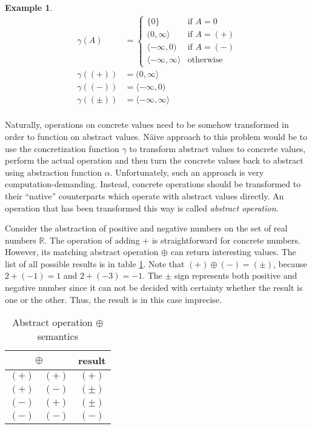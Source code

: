 \documentclass[12pt,final,oneside]{fithesis2}
\theoremstyle{definition}
\newtheorem{example}{Example}[chapter]
\begin{document}
\begin{example}
\label{ex:concretizationfunc}
\begin{align*}
\gamma(A) &=
\begin{cases}
\{ 0 \} & \text{if } A = 0 \\
(0, \infty \rangle & \text{if } A = (+) \\
\langle -\infty, 0) & \text{if } A = (-) \\
\langle -\infty, \infty \rangle & \text{otherwise}
\end{cases} \\
\gamma((+)) &= (0, \infty \rangle \\
\gamma((-)) &= \langle -\infty, 0) \\
\gamma((\pm)) &= \langle -\infty, \infty \rangle \\
\end{align*}
\end{example}

Naturally, operations on concrete values need to be somehow transformed
in order to function on abstract values. N\"{a}ive approach to this problem
would be to use the concretization function $\gamma$ to transform abstract
values to concrete values, perform the actual operation and then turn the
concrete values back to abstract using abstraction function $\alpha$.
Unfortunately, such an approach is very computation-demanding. Instead,
concrete operations should be transformed to their ``native'' counterparts
which operate with abstract values directly. An operation that has been
transformed this way is called \textit{abstract operation}.

Consider the abstraction of positive and negative numbers on the set of real
numbers $\mathbb{R}$. The operation of adding $+$ is straightforward for
concrete numbers. However, its matching abstract operation $\oplus$ can
return interesting values. The list of all possible results is in
table \ref{tab:abstractplus}. Note that $(+) \oplus (-) = (\pm)$, because
$2 + (-1) = 1$ and $2 + (-3) = -1$. The $\pm$ sign represents both
positive and negative number since it can not be decided with certainty
whether the result is one or the other. Thus, the result is in this case
imprecise.

\begin{table}[ht]
\centering
\begin{tabular}{c|c|c}
\multicolumn{2}{c|}{$\oplus$} & result \\
\hline
$(+)$ & $(+)$ & $(+)$ \\
$(+)$ & $(-)$ & $(\pm)$ \\
$(-)$ & $(+)$ & $(\pm)$ \\
$(-)$ & $(-)$ & $(-)$ \\
\end{tabular}
\caption{Abstract operation $\oplus$ semantics}
\label{tab:abstractplus}
\end{table}
\end{document}
